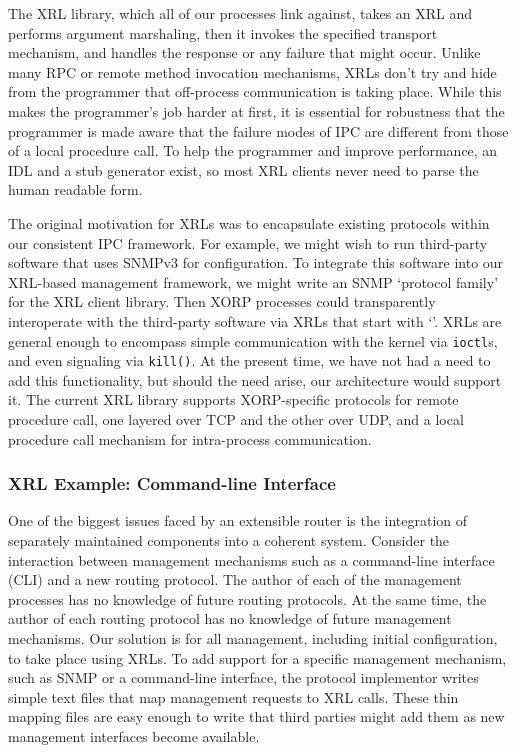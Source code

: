 The XRL library, which all of our processes link against, takes an XRL
and performs argument marshaling, then it invokes the specified transport
mechanism, and handles the response or any
failure that might occur.  Unlike many RPC or remote method invocation
mechanisms, XRLs don't try and hide from the programmer that
off-process communication is taking place.  While this makes the
programmer's job harder at first, it is essential for robustness that
the programmer is made aware that the failure modes of IPC are different from those of
a local procedure call.  
To help the programmer and improve performance, an IDL and a stub
generator exist, so most XRL clients never need to parse the human
readable form.

The original motivation for XRLs was to encapsulate existing
protocols within our consistent IPC framework.   For example, we
might wish to run third-party software that uses SNMPv3 for
configuration. 
To integrate this software into our XRL-based management framework, we
might write an SNMP `protocol family' for the XRL client library.
Then XORP processes could transparently interoperate with the third-party
software via XRLs that start with `'.
XRLs are general enough to encompass simple
communication with the kernel via \texttt{ioctl}s, and even signaling
via \texttt{kill()}.  At the present time, we have not had a need to
add this functionality, but should the need arise, our architecture
would support it.  The current XRL library supports
XORP-specific protocols for remote procedure call, one layered over
TCP and the other over UDP, and a local procedure call mechanism for
intra-process communication.

\subsubsection{XRL Example: Command-line Interface}

One of the biggest issues faced by an {extensible} router is 
the integration of separately maintained components into a coherent
system.  Consider the interaction between management mechanisms such
as a command-line interface (CLI) and a new routing protocol.  The
author of each of the management processes has no knowledge of future
routing protocols.  At the same time, the author of each routing
protocol has no knowledge of future management mechanisms. Our
solution is for all management, including initial configuration, to
take place using XRLs.  To add support for a specific management
mechanism, such as SNMP or a command-line interface, the protocol
implementor writes simple text files that map management requests to
XRL calls.  These thin mapping files are easy enough to write that
third parties might add them as new management interfaces become
available.

